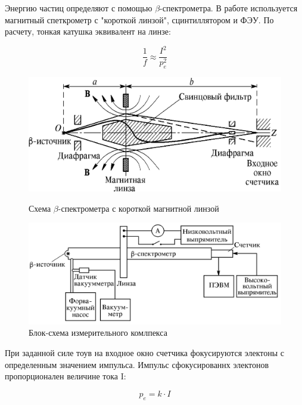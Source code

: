 \documentclass[a4paper]{article}
\begin{document}
Энергию частиц определяют с помощью $\beta$-спектрометра. В работе используется 
магнитный спеткрометр с "короткой линзой", сцинтиллятором и ФЭУ. По расчету, 
тонкая катушка эквивалент на линзе:

\begin{equation}
    \frac{1}{f} \approx \frac{I^2}{p_e^2}
    \label{eq6}
\end{equation}

\begin{figure}[h]
	\begin{center}
	\begin{minipage}[h]{0.45\linewidth}
	\includegraphics[width=1\linewidth]{p2.png}
	\caption{Схема $\beta$-спектрометра с короткой магнитной линзой} 
	\label{p2}
	\end{minipage}
	\hfill 
	\begin{minipage}[h]{0.45\linewidth}
	\includegraphics[width=1\linewidth]{p3.png}
	\caption{Блок-схема измерительного комлпекса}
	\label{p3}
	\end{minipage}
	\end{center}
\end{figure}

При заданной силе тоув на входное окно счетчика фокусируются электоны с 
определенным значением импульса. Импульс сфокусированнх электонов пропорционален 
величине тока I:

\begin{equation}
    p_e = k\cdot I
    \label{eq7}
\end{equation}
\end{document}
